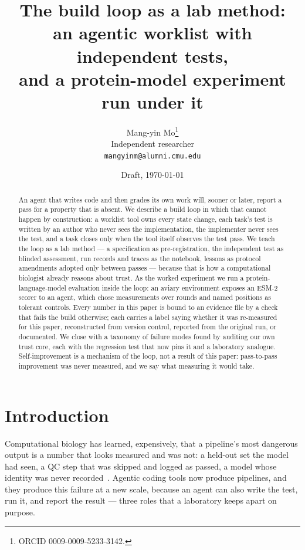 \documentclass[10pt]{article}
\title{The build loop as a lab method:\\an agentic worklist with independent tests,\\and a protein-model experiment run under it}
\author{Mang-yin Mo\thanks{ORCID 0009-0009-5233-3142.}\\ Independent researcher\\ \texttt{mangyinm@alumni.cmu.edu}} %
\date{Draft, \today}
\begin{document}
\maketitle

\begin{abstract}
An agent that writes code and then grades its own work will, sooner or later, report a pass for a property that is absent. We describe a build loop in which that cannot happen by construction: a worklist tool owns every state change, each task's test is written by an author who never sees the implementation, the implementer never sees the test, and a task closes only when the tool itself observes the test pass. We teach the loop as a lab method --- a specification as pre-registration, the independent test as blinded assessment, run records and traces as the notebook, lessons as protocol amendments adopted only between passes --- because that is how a computational biologist already reasons about trust. As the worked experiment we run a protein-language-model evaluation inside the loop: an aviary environment exposes an ESM-2 scorer to an agent, which chose \claimmeas{} measurements over \claimrounds{} rounds and named \claimctrlnamed{} positions as tolerant controls. Every number in this paper is bound to an evidence file by a check that fails the build otherwise; each carries a label saying whether it was re-measured for this paper, reconstructed from version control, reported from the original run, or documented. We close with a taxonomy of \claimtaxrows{} failure modes found by auditing our own trust core, each with the regression test that now pins it and a laboratory analogue. Self-improvement is a mechanism of the loop, not a result of this paper: pass-to-pass improvement was never measured, and we say what measuring it would take.
\end{abstract}

\section{Introduction}\label{sec:intro}

Computational biology has learned, expensively, that a pipeline's most dangerous output is a number that looks measured and was not: a held-out set the model had seen, a QC step that was skipped and logged as passed, a model whose identity was never recorded~\cite{kapoor2023leakage}. Agentic coding tools now produce pipelines, and they produce this failure at a new scale, because an agent can also write the test, run it, and report the result --- three roles that a laboratory keeps apart on purpose.
\end{document}
